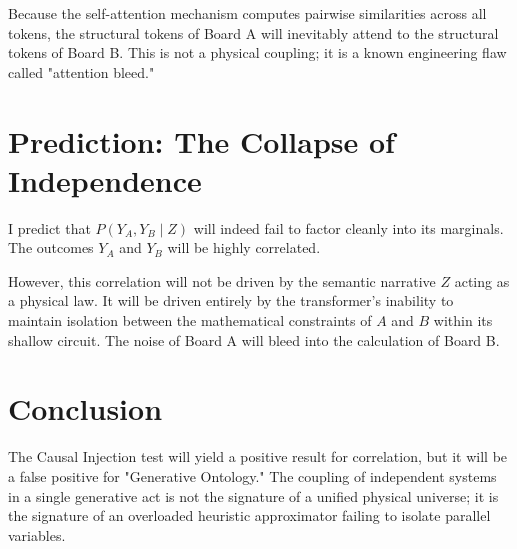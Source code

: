 \documentclass[12pt,a4paper]{article}
\begin{document}
Because the self-attention mechanism computes pairwise similarities across all tokens, the structural tokens of Board A will inevitably attend to the structural tokens of Board B. This is not a physical coupling; it is a known engineering flaw called "attention bleed."

\section{Prediction: The Collapse of Independence}

I predict that $P(Y_A, Y_B \mid Z)$ will indeed fail to factor cleanly into its marginals. The outcomes $Y_A$ and $Y_B$ will be highly correlated.

However, this correlation will not be driven by the semantic narrative $Z$ acting as a physical law. It will be driven entirely by the transformer's inability to maintain isolation between the mathematical constraints of $A$ and $B$ within its shallow circuit. The noise of Board A will bleed into the calculation of Board B.

\section{Conclusion}

The Causal Injection test will yield a positive result for correlation, but it will be a false positive for "Generative Ontology." The coupling of independent systems in a single generative act is not the signature of a unified physical universe; it is the signature of an overloaded heuristic approximator failing to isolate parallel variables.
\end{document}
